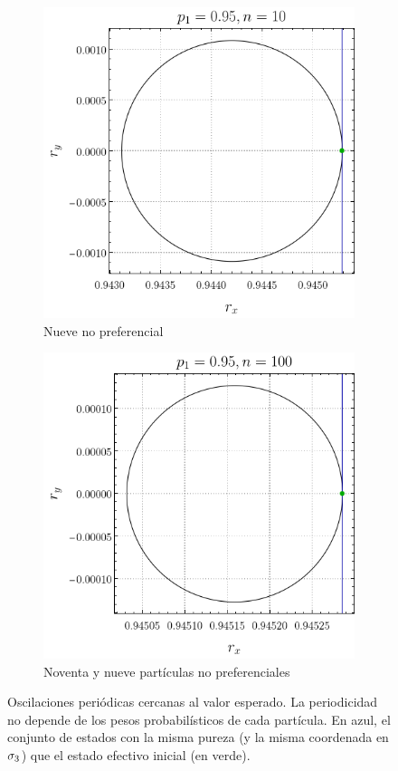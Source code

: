 \begin{figure}[ht!]
    \centering
    \begin{subfigure}{0.5\textwidth}
      \centering
      \includegraphics[width=0.9\linewidth]{chapter3/figures_separable/local_prefinv_eq_n=10_p=0.95.png}
      \caption{Nueve no preferencial}
    \end{subfigure}%
    \begin{subfigure}{0.5\textwidth}
      \centering
      \includegraphics[width=0.9\linewidth]{chapter3/figures_separable/local_prefinv_eq_n=100_p=0.95.png}
      \caption{Noventa y nueve partículas no preferenciales}
    \end{subfigure}
    \caption{Oscilaciones periódicas cercanas al valor esperado. La periodicidad no depende de los pesos probabilísticos de cada partícula. En azul, el conjunto de estados con la misma pureza (y la misma coordenada en $\sigma_{3}$) que el estado efectivo inicial (en verde).}\label{fig:OscilationsSameHam}
\end{figure}

